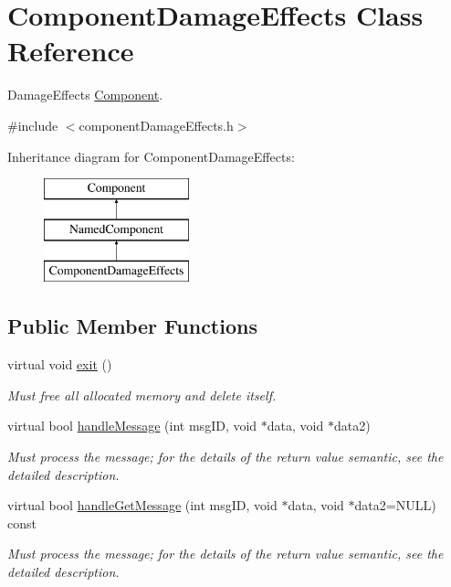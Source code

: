 \hypertarget{classComponentDamageEffects}{
\section{\-Component\-Damage\-Effects \-Class \-Reference}
\label{d0/d4e/classComponentDamageEffects}
}


\-Damage\-Effects \hyperlink{classComponent}{\-Component}.  




{\ttfamily \#include $<$component\-Damage\-Effects.\-h$>$}

\-Inheritance diagram for \-Component\-Damage\-Effects\-:\begin{figure}[H]
\begin{center}
\leavevmode
\includegraphics[height=3.000000cm]{d0/d4e/classComponentDamageEffects}
\end{center}
\end{figure}
\subsection*{\-Public \-Member \-Functions}
\begin{DoxyCompactItemize}
\item 
\hypertarget{classComponentDamageEffects_a4aa5ed92d581f76ee9f39428ba3a3577}{
virtual void \hyperlink{classComponentDamageEffects_a4aa5ed92d581f76ee9f39428ba3a3577}{exit} ()}
\label{d0/d4e/classComponentDamageEffects_a4aa5ed92d581f76ee9f39428ba3a3577}

\begin{DoxyCompactList}\small\item\em \-Must free all allocated memory and delete itself. \end{DoxyCompactList}\item 
virtual bool \hyperlink{classComponentDamageEffects_a23f743603c14c36d34ecabcf71b9e36e}{handle\-Message} (int msg\-I\-D, void $\ast$data, void $\ast$data2)
\begin{DoxyCompactList}\small\item\em \-Must process the message; for the details of the return value semantic, see the detailed description. \end{DoxyCompactList}\item 
virtual bool \hyperlink{classComponentDamageEffects_a68a72231eac1370f8d5169cdf592cbc4}{handle\-Get\-Message} (int msg\-I\-D, void $\ast$data, void $\ast$data2=\-N\-U\-L\-L) const 
\begin{DoxyCompactList}\small\item\em \-Must process the message; for the details of the return value semantic, see the detailed description. \end{DoxyCompactList}\end{DoxyCompactItemize}
